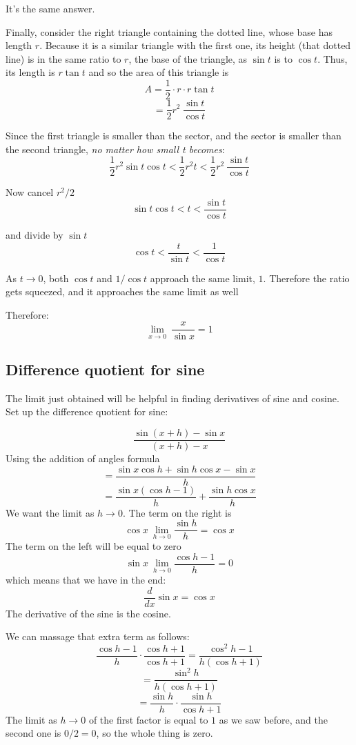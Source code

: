 \documentclass[11pt, oneside]{article}
\begin{document}
It's the same answer.

Finally, consider the right triangle containing the dotted line, whose base has length $r$.  Because it is a similar triangle with the first one, its height (that dotted line) is in the same ratio to $r$, the base of the triangle, as $\sin t$ is to $\cos t$.  Thus, its length is $r \tan t$ and so the area of this triangle is
\[   A = \frac{1}{2} \cdot r \cdot r \tan t   \]
\[    =  \frac{1}{2} r^2 \ \frac{\sin t}{\cos t}  \]

Since the first triangle is smaller than the sector, and the sector is smaller than the second triangle, \emph{no matter how small t becomes}:
\[    \frac{1}{2} r^2 \sin t \cos t < \frac{1}{2} r^2 t < \frac{1}{2} r^2 \ \frac{\sin t}{\cos t}  \]

Now cancel $r^2/2$
\[    \sin t \cos t < t < \frac{\sin t}{\cos t}  \]

and divide by $\sin t$
\[    \cos t < \frac{t}{\sin t} < \frac{1}{\cos t}  \]

As $t \rightarrow 0$, both $\cos t$ and $1/\cos t$ approach the same limit, $1$.  Therefore the ratio gets squeezed, and it approaches the same limit as well

Therefore:
\[    \lim_{x \rightarrow 0} \ \frac{x}{\sin x} = 1  \]

\subsection*{Difference quotient for sine}
The limit just obtained will be helpful in finding derivatives of sine and cosine.  Set up the difference quotient for sine:

\[ \frac{\sin (x + h) - \sin x}{(x + h) - x} \]
Using the addition of angles formula
\[ = \frac{\sin x \cos h + \sin h \cos x - \sin x}{h} \]
\[ = \frac{\sin x (\cos h - 1)}{h} + \frac{\sin h \cos x}{h} \]
We want the limit as $h \rightarrow 0$.  The term on the right is
\[ \cos x \ \lim_{h \rightarrow 0} \frac{\sin h}{h} = \cos x \]
The term on the left will be equal to zero
\[ \sin x \  \lim_{h \rightarrow 0} \frac{\cos h - 1}{h} = 0 \]
which means that we have in the end:
\[ \frac{d}{dx} \sin x = \cos x \]
The derivative of the sine is the cosine.

We can massage that extra term as follows:
\[ \frac{\cos h - 1}{h}  \cdot \frac{\cos h + 1}{\cos h + 1} = \frac{\cos^2 h - 1}{h(\cos h + 1)} \]
\[ = \frac{\sin^2 h}{h(\cos h + 1)} \]
\[ = \frac{\sin h}{h} \cdot \frac{\sin h}{\cos h + 1} \]
The limit as $h \rightarrow 0$ of the first factor is equal to $1$ as we saw before, and the second one is $0/2 = 0$, so the whole thing is zero.
\end{document}

